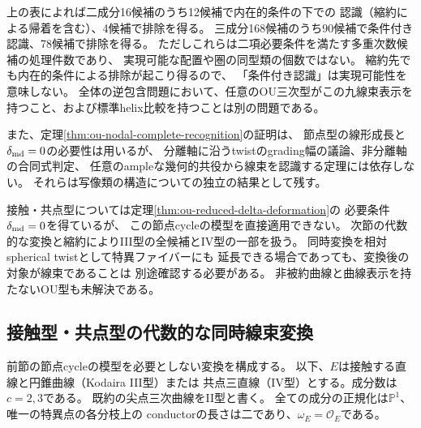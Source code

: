 \begin{remark}[判定の範囲と依存関係]\label{rem:ou-nodal-complete-scope}
上の表によれば二成分16候補のうち12候補で内在的条件の下での
認識（縮約による帰着を含む）、4候補で排除を得る。
三成分168候補のうち90候補で条件付き認識、78候補で排除を得る。
ただしこれらは二項必要条件を満たす多重次数候補の処理件数であり、
実現可能な配置や圏の同型類の個数ではない。
縮約先でも内在的条件による排除が起こり得るので、
「条件付き認識」は実現可能性を意味しない。
全体の逆包含問題において、任意のOU三次型がこの九線束表示を
持つこと、および標準helix比較を持つことは別の問題である。

また、定理\ref{thm:ou-nodal-complete-recognition}の証明は、
節点型の線形成長と$\delta_{\rm md}=0$の必要性は用いるが、
分離軸に沿うtwistのgrading幅の議論、非分離軸の合同式判定、
任意のampleな幾何的共役から線束を認識する定理には依存しない。
それらは写像類の構造についての独立の結果として残す。

接触・共点型については定理\ref{thm:ou-reduced-delta-deformation}の
必要条件$\delta_{\rm md}=0$を得ているが、
この節点cycleの模型を直接適用できない。
次節の代数的な変換と縮約によりIII型の全候補とIV型の一部を扱う。
同時変換を相対spherical twistとして特異ファイバーにも
延長できる場合であっても、変換後の対象が線束であることは
別途確認する必要がある。
非被約曲線と曲線表示を持たないOU型も未解決である。
\end{remark}


\subsection{接触型・共点型の代数的な同時線束変換}
\label{subsec:ou-additive-moves}
前節の節点cycleの模型を必要としない変換を構成する。
以下、$E$は接触する直線と円錐曲線（Kodaira III型）または
共点三直線（IV型）とする。成分数は$c=2,3$である。
既約の尖点三次曲線をII型と書く。
全ての成分の正規化は$\mathbb P^1$、唯一の特異点の各分枝上の
conductorの長さは二であり、$\omega_E=\mathcal O_E$である。

